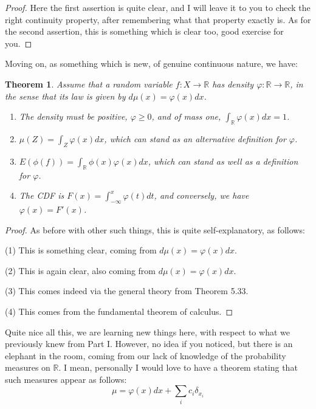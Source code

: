 \documentclass[12pt]{amsbook}
\newtheorem{theorem}{Theorem}[chapter]
\begin{document}
\begin{proof}
Here the first assertion is quite clear, and I will leave it to you to check the right continuity property, after remembering what that property exactly is. As for the second assertion, this is something which is clear too, good exercise for you.
\end{proof}

Moving on, as something which is new, of genuine continuous nature, we have:

\begin{theorem}
Assume that a random variable $f:X\to\mathbb R$ has density $\varphi:\mathbb R\to\mathbb R$, in the sense that its law is given by $d\mu(x)=\varphi(x)dx$.
\begin{enumerate}
\item The density must be positive, $\varphi\geq0$, and of mass one, $\int_\mathbb R\varphi(x)dx=1$.

\item $\mu(Z)=\int_Z\varphi(x)dx$, which can stand as an alternative definition for $\varphi$.

\item $E(\phi(f))=\int_\mathbb R\phi(x)\varphi(x)dx$, which can stand as well as a definition for $\varphi$.

\item The CDF is $F(x)=\int_{-\infty}^x\varphi(t)dt$, and conversely, we have $\varphi(x)=F'(x)$.
\end{enumerate}
\end{theorem}

\begin{proof}
As before with other such things, this is quite self-explanatory, as follows:

\medskip

(1) This is something clear, coming from $d\mu(x)=\varphi(x)dx$.

\medskip

(2) This is again clear, also coming from $d\mu(x)=\varphi(x)dx$.

\medskip

(3) This comes indeed via the general theory from Theorem 5.33.

\medskip

(4) This comes from the fundamental theorem of calculus.
\end{proof}

Quite nice all this, we are learning new things here, with respect to what we previously knew from Part I. However, no idea if you noticed, but there is an elephant in the room, coming from our lack of knowledge of the probability measures on $\mathbb R$. I mean, personally I would love to have a theorem stating that such measures appear as follows:
$$\mu=\varphi(x)dx+\sum_ic_i\delta_{x_i}$$
\end{document}
